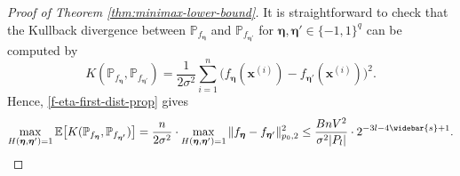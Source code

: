 \documentclass[10pt]{article}
\newcommand{\E}{{\mathbb E}}
\renewcommand{\P}{{\mathbb P}}
\newcommand{\xbf}{{\mathbf{x}}}
\newcommand{\etabf}{{\boldsymbol{\eta}}}
\begin{document}
\begin{proof}[Proof of Theorem \ref{thm:minimax-lower-bound}]
It is straightforward to check that the Kullback divergence between 
$\P_{f_\etabf}$ and $\P_{f_{\etabf'}}$ for 
$\etabf, \etabf' \in \{-1, 1\}^q$ can be computed by 
\begin{equation*}
    K(\P_{f_{\etabf}}, \P_{f_{\etabf'}}) 
    = \frac{1}{2\sigma^2} \sum_{i=1}^{n} 
    \big(f_{\etabf}(\xbf^{(i)}) - f_{\etabf'}(\xbf^{(i)})\big)^2.
\end{equation*}
Hence, \eqref{f-eta-first-dist-prop} gives
\begin{equation}\label{prob-dist-prop}
    \max_{H(\etabf, \etabf') = 1} 
    \E \big[K(\P_{f_{\etabf}}, \P_{f_{\etabf'}})\big] 
    = \frac{n}{2\sigma^2} \cdot  \max_{H(\etabf, \etabf') = 1} 
    \| f_{\etabf} - f_{\etabf'} 
    \|_{p_0, 2}^2 \le \frac{B n V^2}{\sigma^2|P_l|} 
    \cdot 2^{-3l - 4\widebar{s} + 1}.
\end{equation}


\end{proof}
\end{document}
